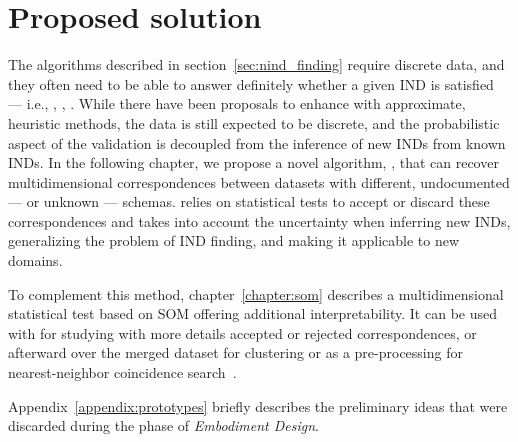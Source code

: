 \section{Proposed solution}
\label{sec:gaps/proposed}
The algorithms described in section~\ref{sec:nind_finding} require
discrete data, and they often need to be able to answer definitely whether
a given \gls{IND} is satisfied --- i.e., \Mind, \Zigzag, \Find.
While there have been proposals to enhance \Find with approximate,
heuristic methods, the data is still expected
to be discrete, and the probabilistic aspect of the validation is decoupled
from the inference of new \glspl{IND} from known \glspl{IND}.
In the following chapter, we propose a novel algorithm, \PresQ, that
can recover multidimensional correspondences between datasets with different,
undocumented --- or unknown --- schemas. \PresQ relies on statistical tests 
to accept or discard these correspondences and takes into account the 
uncertainty when inferring new \glspl{IND}, generalizing
the problem of \gls{IND} finding, and making it applicable to new domains.

To complement this method, chapter~\ref{chapter:som} describes a multidimensional
statistical test based on \gls{SOM} offering additional interpretability. It can be
used with \PresQ for studying with more details accepted or rejected correspondences,
or afterward over the merged dataset for clustering or as a pre-processing for nearest-neighbor
coincidence search~\cite{silva2011som}.

Appendix~\ref{appendix:prototypes} briefly describes the preliminary ideas that were
discarded during the phase of \emph{Embodiment Design}.

